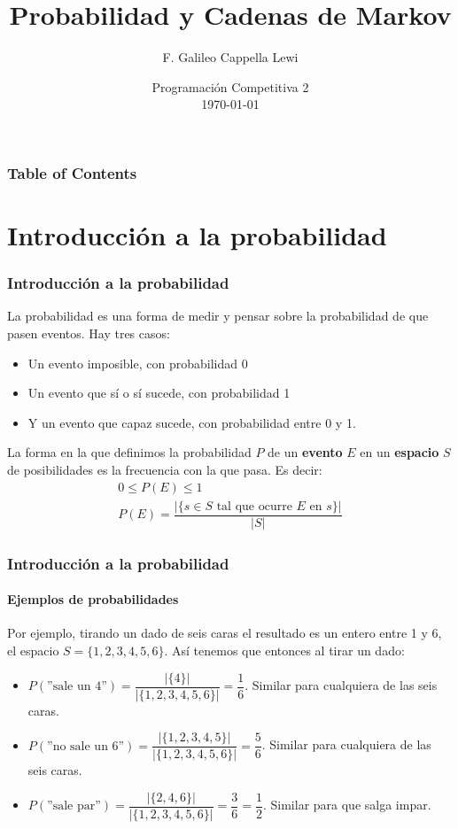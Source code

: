 \documentclass{beamer}
\title{Probabilidad y Cadenas de Markov}
\author{F. Galileo Cappella Lewi}
\date[PC2 2023]{Programación Competitiva 2\\\today}
\begin{document}
\frame{\titlepage}

\begin{frame}
  \frametitle{Table of Contents}
  \tableofcontents
\end{frame}

\newcommand{\SECTIONA}{Introducción a la probabilidad}
\section{\SECTIONA}

\begin{frame}
  \frametitle{\SECTIONA}

  La probabilidad es una forma de medir y pensar sobre la probabilidad de que pasen eventos. \pause Hay tres casos:
  \begin{itemize}
    \item Un evento imposible, con probabilidad 0
    \item Un evento que sí o sí sucede, con probabilidad 1
    \item Y un evento que capaz sucede, con probabilidad entre 0 y 1.
  \end{itemize} \pause
  La forma en la que definimos la probabilidad \(P\) de un \textbf{evento} \(E\) en un \textbf{espacio} \(S\) de posibilidades es la frecuencia con la que pasa. Es decir:
  \begin{gather*}
    0 \leq P(E) \leq 1 \\
    P(E) = \dfrac{|\{s \in S \text{ tal que ocurre } E \text{ en } s\}|}{|S|}
  \end{gather*}
\end{frame}

\begin{frame}
  \frametitle{\SECTIONA}
  \framesubtitle{Ejemplos de probabilidades}

  Por ejemplo, tirando un dado de seis caras el resultado es un entero entre 1 y 6, el espacio \(S = \{1, 2, 3, 4, 5, 6\}\). \pause Así tenemos que entonces al tirar un dado:
  \begin{itemize}
    \item<2-> \(P(\text{''sale un 4''}) = \dfrac{|\{4\}|}{|\{1, 2, 3, 4, 5, 6\}|} = \dfrac{1}{6}\). Similar para cualquiera de las seis caras.
    \item<3-> \(P(\text{''no sale un 6''}) = \dfrac{|\{1, 2, 3, 4, 5\}|}{|\{1, 2, 3, 4, 5, 6\}|} = \dfrac{5}{6}\). Similar para cualquiera de las seis caras.
    \item<4-> \(P(\text{''sale par''}) = \dfrac{|\{2, 4, 6\}|}{|\{1, 2, 3, 4, 5, 6\}|} = \dfrac{3}{6} = \dfrac{1}{2}\). Similar para que salga impar.
  \end{itemize}
\end{frame}
\end{document}
